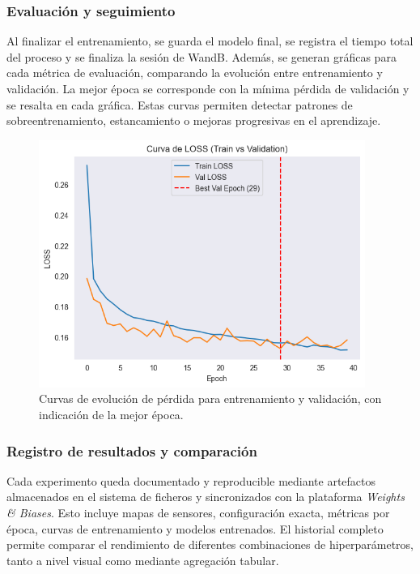 \subsubsection*{Evaluación y seguimiento}  
Al finalizar el entrenamiento, se guarda el modelo final, se registra el tiempo total del proceso y se finaliza la sesión de WandB. Además, se generan gráficas para cada métrica de evaluación, comparando la evolución entre entrenamiento y validación. La mejor época se corresponde con la mínima pérdida de validación y se resalta en cada gráfica. Estas curvas permiten detectar patrones de sobreentrenamiento, estancamiento o mejoras progresivas en el aprendizaje.

\begin{figure}[H]
	\centering
	\includegraphics[width=0.95\textwidth]{includes/cap5/loss_curve_example.png}
	\caption{Curvas de evolución de pérdida para entrenamiento y validación, con indicación de la mejor época.}
	\label{fig:loss_curve_example}
\end{figure}

\subsubsection*{Registro de resultados y comparación}  
Cada experimento queda documentado y reproducible mediante artefactos almacenados en el sistema de ficheros y sincronizados con la plataforma \textit{Weights \& Biases}. Esto incluye mapas de sensores, configuración exacta, métricas por época, curvas de entrenamiento y modelos entrenados. El historial completo permite comparar el rendimiento de diferentes combinaciones de hiperparámetros, tanto a nivel visual como mediante agregación tabular.
